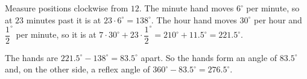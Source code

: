 Measure positions clockwise from $12$. The minute hand moves $6^\circ$ per minute, so at $23$ minutes past it is at $23\cdot6^\circ=138^\circ$. The hour hand moves $30^\circ$ per hour and $\dfrac{1}{2}^\circ$ per minute, so it is at $7\cdot30^\circ+23\cdot\dfrac{1}{2}^\circ=210^\circ+11.5^\circ=221.5^\circ$.

The hands are $221.5^\circ-138^\circ=83.5^\circ$ apart. So the hands form an angle of $\boxed{83.5^\circ}$ and, on the other side, a reflex angle of $360^\circ-83.5^\circ=\boxed{276.5^\circ}$.
